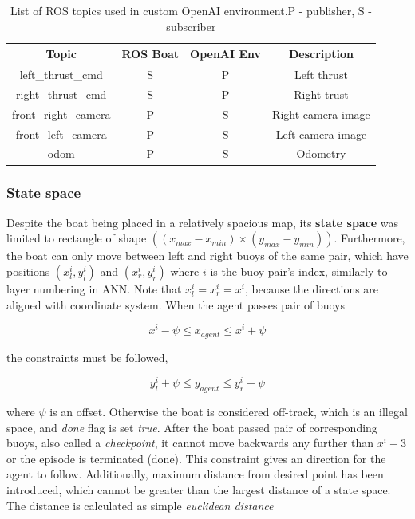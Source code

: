 \begin{table}[h]
    \centering
    \begin{tabular}{||c c c c||}
        \hline
        Topic & ROS Boat &  OpenAI Env & Description \\
        \hline\hline
        left\_thrust\_cmd & S & P & Left thrust \\
        right\_thrust\_cmd & S & P & Right trust \\
        front\_right\_camera & P & S & Right camera image \\
        front\_left\_camera & P & S & Left camera image \\
        odom & P & S & Odometry \\
        \hline
    \end{tabular}
    \caption{List of ROS topics used in custom OpenAI environment.\newline P - publisher, S - subscriber}
    \label{tab:ros-topics}
\end{table}

\subsubsection*{State space}
\label{sub2:state-space}

Despite the boat being placed in a relatively spacious map, its \textbf{state space} was limited to rectangle of shape $\left( (x_{max} - x_{min}) \times (y_{max} - y_{min})\right)$. Furthermore, the boat can only move between left and right buoys of the same pair, which have positions $(x^i_l, y^i_l)$ and $(x^i_r, y^i_r)$ where $i$ is the buoy pair's index, similarly to layer numbering in ANN. Note that $x^i_l = x^i_r = x^i$, because the directions are aligned with coordinate system. When the agent passes pair of buoys

\begin{equation}
    x^i - \psi \leq x_{agent} \leq x^i + \psi
\label{eq:5.1}
\end{equation}

the constraints must be followed,

\begin{equation}
    y^i_l + \psi \leq y_{agent} \leq y^i_r + \psi
\label{eq:5.2}
\end{equation}

where $\psi$ is an offset. Otherwise the boat is considered off-track, which is an illegal space, and \emph{done} flag is set \emph{true}. After the boat passed pair of corresponding buoys, also called a \emph{checkpoint}, it cannot move backwards any further than $x^i - 3$ or the episode is terminated (done). This constraint gives an direction for the agent to follow. Additionally, maximum distance from desired point has been introduced, which cannot be greater than the largest distance of a state space. The distance is calculated as simple \emph{euclidean distance}

